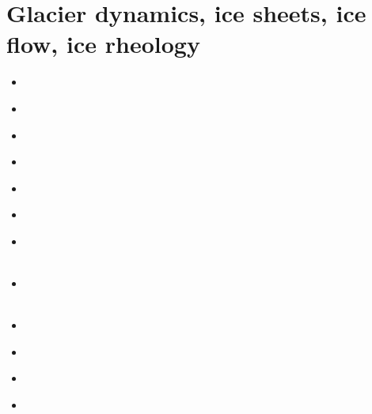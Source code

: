 \section{Glacier dynamics, ice sheets, ice flow, ice rheology}

\begin{scriptsize}
\begin{itemize}
\item[\nineteeneightynine] 
\textcite{buja89} \cite{buja89}\\
\item[\nineteenninety] 
\textcite{vawh90} \cite{vawh90}\\
\item[\nineteenninetyfour] 
\textcite{wizh94} \cite{wizh94}\\
\item[\nineteenninetyseven] 
\textcite{grev97} \cite{grev97}\\
\item[\twothousandone] 
\textcite{goko01} \cite{goko01}\\
\item[\twothousandfour] 
\textcite{frmm04} \cite{frmm04}\\
\item[\twothousandsix] 
\textcite{asbl06} \cite{asbl06}\\
\textcite{frmm06} \cite{frmm06}\\
\item[\twothousandseven] 
\textcite{susp07} \cite{susp07}\\
\textcite{zwgg07} \cite{zwgg07}\\
\item[\twothousandeleven] 
\textcite{zhjg11} \cite{zhjg11}\\
\item[\twothousandtwelve] 
\textcite{pode12} \cite{pode12}\\
\item[\twothousandthirteen] 
\textcite{raab13} \cite{raab13}\\
\item[\twothousandfourteen] 
\textcite{lejx14} \cite{lejx14}\\

\end{itemize}
\end{scriptsize}
